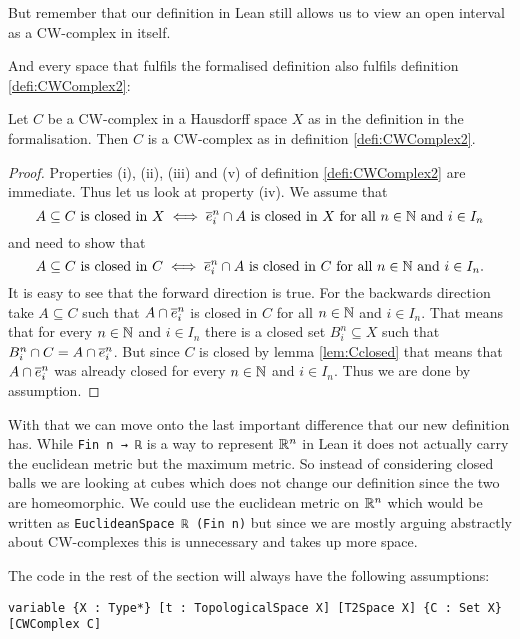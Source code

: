 But remember that our definition in Lean still allows us to view an open interval as a CW-complex in itself.

And every space that fulfils the formalised definition also fulfils definition \ref{defi:CWComplex2}: 

\begin{lem}
  Let $C$ be a CW-complex in a Hausdorff space $X$ as in the definition in the formalisation. 
  Then $C$ is a CW-complex as in definition \ref{defi:CWComplex2}. 
\end{lem}
\begin{proof}
  Properties (i), (ii), (iii) and (v) of definition \ref{defi:CWComplex2} are immediate. 
  Thus let us look at property (iv). 
  We assume that 
  \[A \subseteq C \text{ is closed in } X \iff \closedCell{n}{i} \cap A \text{ is closed in } X \text{ for all } n \in \bN \text{ and } i \in I_n\]
  and need to show that 
  \[A \subseteq C \text{ is closed in } C \iff \closedCell{n}{i} \cap A \text{ is closed in } C \text{ for all } n \in \bN \text{ and } i \in I_n.\]
  It is easy to see that the forward direction is true. 
  For the backwards direction take $A \subseteq C$ such that $A \cap \closedCell{n}{i}$ is closed in $C$ for all $n \in \bN$ and $i \in I_n$. 
  That means that for every $n \in \bN$ and $i \in I_n$ there is a closed set $B_i^n \subseteq X$ such that $B^n_i \cap C = A \cap \closedCell{n}{i}$. 
  But since $C$ is closed by lemma \ref{lem:Cclosed} that means that $A \cap \closedCell{n}{i}$ was already closed for every $n \in \bN$ and $i \in I_n$. 
  Thus we are done by assumption.
\end{proof}

With that we can move onto the last important difference that our new definition has. 
While \lstinline{Fin n → ℝ} is a way to represent $\bR^n$ in Lean it does not actually carry the euclidean metric but the maximum metric.
So instead of considering closed balls we are looking at cubes which does not change our definition since the two are homeomorphic. 
We could use the euclidean metric on $\bR^n$ which would be written as \lstinline{EuclideanSpace ℝ (Fin n)} but since we are mostly arguing abstractly about CW-complexes this is unnecessary and takes up more space. 

The code in the rest of the section will always have the following assumptions: 

\begin{lstlisting}
variable {X : Type*} [t : TopologicalSpace X] [T2Space X] {C : Set X} [CWComplex C]
\end{lstlisting}

